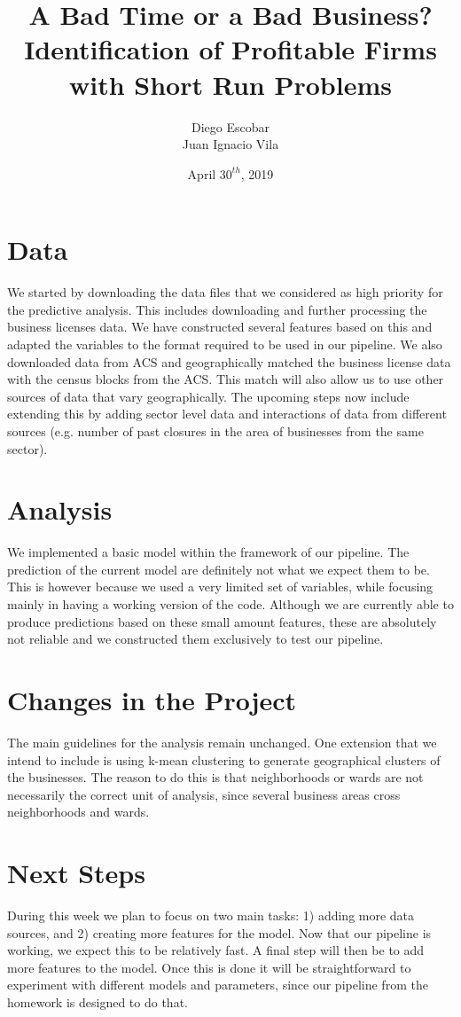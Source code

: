 \documentclass{article}
\title{A Bad Time or a Bad Business? Identification of Profitable Firms with Short Run Problems}
\author{Diego Escobar \\
        Juan Ignacio Vila}
\date{April $30^{th}$, 2019}
\begin{document}
\maketitle

\section{Data}

We started by downloading the data files that we considered as high priority for the predictive analysis. This includes downloading and further processing the business licenses data. We have constructed several features based on this and adapted the variables to the format required to be used in our pipeline. We also downloaded data from ACS and geographically matched the business license data with the census blocks from the ACS. This match will also allow us to use other sources of data that vary geographically. The upcoming steps now include extending this by adding sector level data and interactions of data from different sources (e.g. number of past closures in the area of businesses from the same sector).

\section{Analysis}

We implemented a basic model within the framework of our pipeline. The prediction of the current model are definitely not what we expect them to be. This is however because we used a very limited set of variables, while focusing mainly in having a working version of the code. Although we are currently able to produce predictions based on these small amount features, these are absolutely not reliable and we constructed them exclusively to test our pipeline.

\section{Changes in the Project}

The main guidelines for the analysis remain unchanged. One extension that we intend to include is using k-mean clustering to generate geographical clusters of the businesses. The reason to do this is that neighborhoods or wards are not necessarily the correct unit of analysis, since several business areas cross neighborhoods and wards.

\section{Next Steps}

During this week we plan to focus on two main tasks: 1) adding more data sources, and 2) creating more features for the model. Now that our pipeline is working, we expect this to be relatively fast. A final step will then be to add more features to the model. Once this is done it will be straightforward to experiment with different models and parameters, since our pipeline from the homework is designed to do that.
\end{document}
